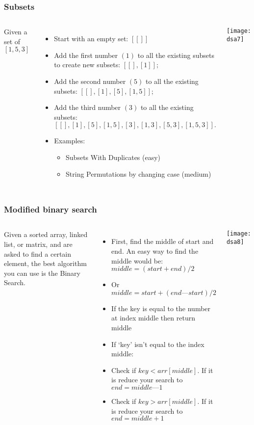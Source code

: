 \begin{frame}[fragile]
	\frametitle{Subsets}
	\begin{columns}[T]
Given a set of $[1, 5, 3]$
			\begin{itemize}
			\item Start with an empty set: $[[]]$
			\item Add the first number $(1)$ to all the existing subsets to create new subsets: $[[], [1]];$
			\item Add the second number $(5)$ to all the existing subsets: $[[], [1], [5], [1,5]];$
			\item Add the third number $(3)$ to all the existing subsets: $[[], [1], [5], [1,5], [3], [1,3], [5,3], [1,5,3]].$
				\item Examples:
			\begin{itemize}
				\item Subsets With Duplicates (easy)
				\item String Permutations by changing case (medium)
			\end{itemize}

			\end{itemize}
			
		
\begin{center}
\texttt{[image: dsa7]}
\end{center}		
		\end{columns}		
\end{frame}

\begin{frame}[fragile]
	\frametitle{Modified binary search}
	\begin{columns}[T]
Given a sorted array, linked list, or matrix, and are asked to find a certain element, the best algorithm you can use is the Binary Search.			
\begin{itemize}
			\item First, find the middle of start and end. An easy way to find the middle would be: $middle = (start + end) / 2$
			\item Or $middle = start + (end — start) / 2$
			\item If the key is equal to the number at index middle then return middle
			\item If ‘key’ isn’t equal to the index middle:
			\item Check if $key < arr[middle]$. If it is reduce your search to $end = middle — 1$
			\item Check if $key > arr[middle]$. If it is reduce your search to $end = middle + 1$
			\end{itemize}

			
		
\begin{center}
\texttt{[image: dsa8]}
\end{center}		
		\end{columns}		
\end{frame}

